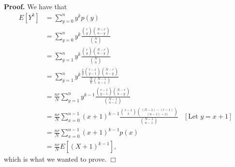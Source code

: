\documentclass[9pt]{article}
\newcommand{\qed}{\hfill \ensuremath{\Box}}
\newcommand{\D}{\displaystyle}
\begin{document}
\begin{enumerate}
      \textbf{Proof.} We have that
      \begin{align*}
         E[Y^k] &= \sum_{y=0}^ny^kp(y) \\
                &= \sum_{y=0}^ny^k \frac{\D\binom{r}{y}\binom{N-r}{n-y}}
                                        {\D\binom{N}{n}} \\
                &= \sum_{y=1}^ny^k \frac{\D\binom{r}{y}\binom{N-r}{n-y}}
                                        {\D\binom{N}{n}} \\
                &= \sum_{y=1}^ny^k \frac{\D\frac{r}{y}\binom{r-1}{y-1}
                   \binom{N-r}{n-y}}{\D\frac{N}{n}\binom{N-1}{n-1}} \\
                &= \frac{nr}{N}\sum_{y=1}^ny^{k-1} \frac{\D\binom{r-1}{y-1}
                   \binom{N-r}{n-y}}{\D\binom{N-1}{n-1}} \\
                &= \frac{nr}{N}\sum_{x=0}^{n-1}(x+1)^{k-1}\frac{\D\binom{r-1}{x}
                   \binom{(N-1)-(r-1)}{(n-1)-x)}}{\D\binom{N-1}{n-1}}
                   &[\text{Let } y = x + 1] \\
                &= \frac{nr}{N}\sum_{x=0}^{n-1}(x+1)^{k-1}p(x) \\
                &= \frac{nr}{N}E[(X+1)^{k-1}],
      \end{align*}
      which is what we wanted to prove. \qed
\end{enumerate}
\end{document}
